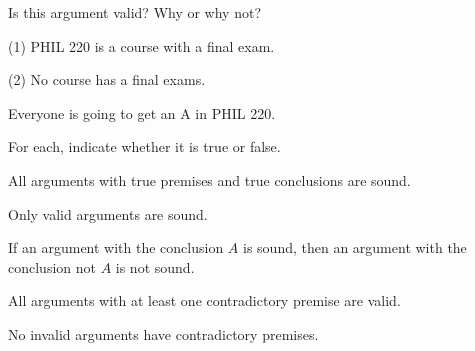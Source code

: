 \problempart
\label{pr.ImpossiblePremises}
Is this argument valid? Why or why not?
\begin{earg}
\item[(1)] PHIL 220 is a course with a final exam.
\item[(2)] No course has a final exams.
\item[\therefore] Everyone is going to get an A in PHIL 220.
\end{earg}

\problempart
\label{hw1.A}
For each, indicate whether it is true or false.
	\begin{earg}
		\item All arguments with true premises and true conclusions are sound.
		\item Only valid arguments are sound.
		\item If an argument with the conclusion $A$ is sound, then an argument with the conclusion not $A$ is not sound.
		\item All arguments with at least one contradictory premise are valid.
		\item No invalid arguments have contradictory premises.
	\end{earg}
	
